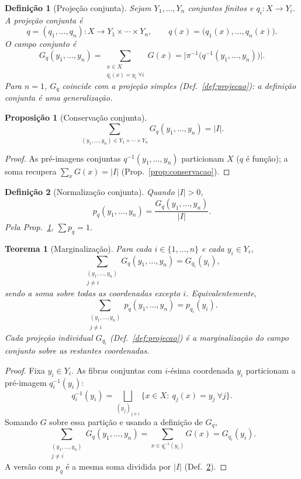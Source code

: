 \documentclass[11pt,a4paper]{article}
\newtheorem{definicao}{Definição}
\newtheorem{teorema}{Teorema}
\newtheorem{proposicao}{Proposição}
\begin{document}
\begin{definicao}[Projeção conjunta]
\label{def:projecao-conjunta}
Sejam \(Y_1,\dots,Y_n\) conjuntos finitos e \(q_i\colon X\to Y_i\). A projeção
conjunta é
\[
q=(q_1,\dots,q_n)\colon X\to Y_1\times\cdots\times Y_n,
\qquad
q(x)=\bigl(q_1(x),\dots,q_n(x)\bigr).
\]
O campo conjunto é
\[
G_q(y_1,\dots,y_n)
=
\sum_{\substack{x\in X\\ q_i(x)=y_i\;\forall i}}G(x)
=
\bigl\lvert\pi^{-1}\bigl(q^{-1}(y_1,\dots,y_n)\bigr)\bigr\rvert.
\]
Para \(n=1\), \(G_q\) coincide com a projeção simples
(Def.~\ref{def:projecao}): a definição conjunta é uma generalização.
\end{definicao}

\begin{proposicao}[Conservação conjunta]
\label{prop:conjunta-conserva}
\[
\sum_{(y_1,\dots,y_n)\in Y_1\times\cdots\times Y_n}G_q(y_1,\dots,y_n)=\lvert I\rvert.
\]
\end{proposicao}

\begin{proof}
As pré-imagens conjuntas \(q^{-1}(y_1,\dots,y_n)\) particionam \(X\) (\(q\) é
função); a soma recupera \(\sum_x G(x)=\lvert I\rvert\)
(Prop.~\ref{prop:conservacao}).
\end{proof}

\begin{definicao}[Normalização conjunta]
\label{def:pq-conjunta}
Quando \(\lvert I\rvert>0\),
\[
p_q(y_1,\dots,y_n)=\frac{G_q(y_1,\dots,y_n)}{\lvert I\rvert}.
\]
Pela Prop.~\ref{prop:conjunta-conserva}, \(\sum p_q=1\).
\end{definicao}

\begin{teorema}[Marginalização]
\label{thm:marginal}
Para cada \(i\in\{1,\dots,n\}\) e cada \(y_i\in Y_i\),
\[
\boxed{
\sum_{\substack{(y_1,\dots,y_n)\\ j\neq i}}G_q(y_1,\dots,y_n)
=
G_{q_i}(y_i),
}
\]
sendo a soma sobre todas as coordenadas excepto \(i\). Equivalentemente,
\[
\sum_{\substack{(y_1,\dots,y_n)\\ j\neq i}}p_q(y_1,\dots,y_n)
=
p_{q_i}(y_i).
\]
Cada projeção individual \(G_{q_i}\) (Def.~\ref{def:projecao}) é a
marginalização do campo conjunto sobre as restantes coordenadas.
\end{teorema}

\begin{proof}
Fixa \(y_i\in Y_i\). As fibras conjuntas com \(i\)-ésima coordenada \(y_i\)
particionam a pré-imagem \(q_i^{-1}(y_i)\):
\[
q_i^{-1}(y_i)
=
\bigsqcup_{(y_j)_{j\neq i}}
\bigl\{x\in X:\ q_j(x)=y_j\ \forall j\bigr\}.
\]
Somando \(G\) sobre essa partição e usando a definição de \(G_q\),
\[
\sum_{\substack{(y_1,\dots,y_n)\\ j\neq i}}G_q(y_1,\dots,y_n)
=
\sum_{x\in q_i^{-1}(y_i)}G(x)
=
G_{q_i}(y_i).
\]
A versão com \(p_q\) é a mesma soma dividida por \(\lvert I\rvert\)
(Def.~\ref{def:pq-conjunta}).
\end{proof}
\end{document}
